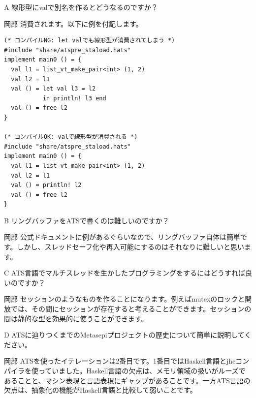 \documentclass{ipsjprosym}
\begin{document}
\begin{QandA}
\item[A] 線形型にvalで別名を作るとどうなるのですか？
\item[岡部] 消費されます。以下に例を付記します。

\begin{verbatim}
(* コンパイルNG: let valでも線形型が消費されてしまう *)
#include "share/atspre_staload.hats"
implement main0 () = {
  val l1 = list_vt_make_pair<int> (1, 2)
  val l2 = l1
  val () = let val l3 = l2
           in println! l3 end
  val () = free l2
}

(* コンパイルOK: valで線形型が消費される *)
#include "share/atspre_staload.hats"
implement main0 () = {
  val l1 = list_vt_make_pair<int> (1, 2)
  val l2 = l1
  val () = println! l2
  val () = free l2
}
\end{verbatim}

\item[B] リングバッファをATSで書くのは難しいのですか？
\item[岡部] 公式ドキュメントに例があるぐらいなので、リングバッファ自体は簡単です。しかし、スレッドセーフ化や再入可能にするのはそれなりに難しいと思います。
\item[C] ATS言語でマルチスレッドを生かしたプログラミングをするにはどうすれば良いのですか？
\item[岡部] セッションのようなものを作ることになります。例えばmutexのロックと開放では、その間にセッションが存在すると考えることができます。セッションの間は静的な型を効果的に使うことができます。
\item[D] ATSに辿りつくまでのMetasepiプロジェクトの歴史について簡単に説明してください。
\item[岡部] ATSを使ったイテレーションは2番目です。1番目ではHaskell言語とjhcコンパイラを使っていました。Haskell言語の欠点は、メモリ領域の扱いがルーズであることと、マシン表現と言語表現にギャップがあることです。一方ATS言語の欠点は、抽象化の機能がHaskell言語と比較して弱いことです。
\end{QandA}



\end{document}
